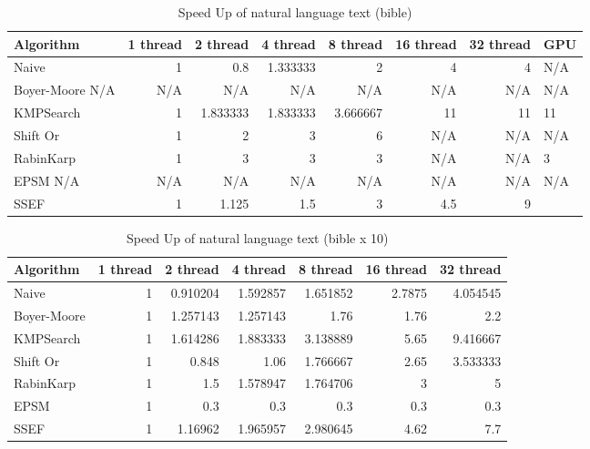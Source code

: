 \documentclass[11pt]{article}       %
\begin{document}
\begin{table}[htbp]
  \centering
  \caption{Speed Up of natural language text (bible)}
    \begin{tabular}{lrrrrrr}\label{t7}
Algorithm & 1 thread & 2 thread & 4 thread & 8 thread & 16 thread & 32 thread & GPU \\
 \hline
    Naive & 1     & 0.8   & 1.333333 & 2     & 4     & 4     &  N/A \\
    {Boyer-Moore} N/A &  N/A     &  N/A     &  N/A     &  N/A     &  N/A     &  N/A     &  N/A \\
    KMPSearch & 1     & 1.833333 & 1.833333 & 3.666667 & 11    & 11    & 11 \\
    Shift Or & 1     & 2     & 3     & 6     &    N/A   &    N/A    &  N/A \\
    RabinKarp & 1     & 3     & 3     & 3     &    N/A    &     N/A   & 3 \\
    EPSM  N/A &  N/A     & N/A     &  N/A     &  N/A     &  N/A    &  N/A   &  N/A \\
    SSEF  & 1     & 1.125 & 1.5   & 3     & 4.5   & 9     &  \\
    \end{tabular}%
  \label{tab:addlabel}%
\end{table}%
\begin{table}[htbp]
  \centering
  \caption{Speed Up of natural language text (bible x 10)}
    \begin{tabular}{lrrrrrr}\label{t11}
Algorithm & 1 thread & 2 thread & 4 thread & 8 thread & 16 thread & 32 thread \\
 \hline
    Naive & 1     & 0.910204 & 1.592857 & 1.651852 & 2.7875 & 4.054545 \\
    Boyer-Moore & 1     & 1.257143 & 1.257143 & 1.76  & 1.76  & 2.2 \\
    KMPSearch & 1     & 1.614286 & 1.883333 & 3.138889 & 5.65  & 9.416667 \\
    Shift Or & 1     & 0.848 & 1.06  & 1.766667 & 2.65  & 3.533333 \\
    RabinKarp & 1     & 1.5   & 1.578947 & 1.764706 & 3     & 5 \\
    EPSM  & 1     & 0.3   & 0.3   & 0.3   & 0.3   & 0.3 \\
    SSEF  & 1     & 1.16962 & 1.965957 & 2.980645 & 4.62  & 7.7 \\
    \end{tabular}%
  \label{tab:addlabel}%
\end{table}%
\end{document}
